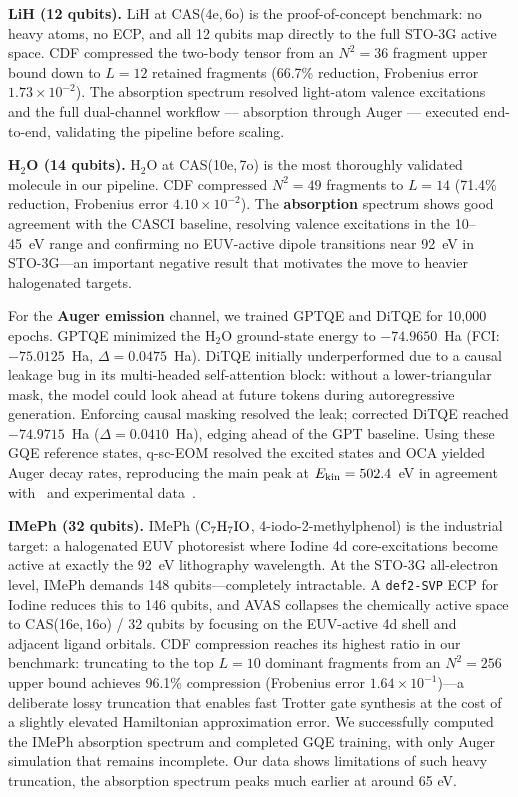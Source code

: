 \documentclass[11pt]{article}
\begin{document}
\textbf{LiH (12 qubits).}
LiH at CAS(4e,\,6o) is the proof-of-concept benchmark: no heavy atoms, no ECP, and all 12 qubits map directly to the full STO-3G active space. CDF compressed the two-body tensor from an $N^2 = 36$ fragment upper bound down to $L = 12$ retained fragments (66.7\% reduction, Frobenius error $1.73 \times 10^{-2}$). The absorption spectrum resolved light-atom valence excitations and the full dual-channel workflow --- absorption through Auger --- executed end-to-end, validating the pipeline before scaling.

\textbf{H$_2$O (14 qubits).}
H$_2$O at CAS(10e,\,7o) is the most thoroughly validated molecule in our pipeline. CDF compressed $N^2 = 49$ fragments to $L = 14$ (71.4\% reduction, Frobenius error $4.10 \times 10^{-2}$). The \textbf{absorption} spectrum shows good agreement with the CASCI baseline, resolving valence excitations in the 10--45~eV range and confirming no EUV-active dipole transitions near 92~eV in STO-3G---an important negative result that motivates the move to heavier halogenated targets.

For the \textbf{Auger emission} channel, we trained GPTQE and DiTQE for 10{,}000 epochs. GPTQE minimized the H$_2$O ground-state energy to $-74.9650$~Ha (FCI: $-75.0125$~Ha, $\Delta = 0.0475$~Ha). DiTQE initially underperformed due to a causal leakage bug in its multi-headed self-attention block: without a lower-triangular mask, the model could look ahead at future tokens during autoregressive generation. Enforcing causal masking resolved the leak; corrected DiTQE reached $-74.9715$~Ha ($\Delta = 0.0410$~Ha), edging ahead of the GPT baseline. Using these GQE reference states, q-sc-EOM resolved the excited states and OCA yielded Auger decay rates, reproducing the main peak at $E_{\rm kin} = 502.4$~eV in agreement with~\cite{keithley2026} and experimental data~\cite{moddeman1973}.

\textbf{IMePh (32 qubits).}
IMePh ($\rm C_7H_7IO$, 4-iodo-2-methylphenol) is the industrial target: a halogenated EUV photoresist where Iodine 4d core-excitations become active at exactly the 92~eV lithography wavelength. At the STO-3G all-electron level, IMePh demands 148 qubits---completely intractable. A \texttt{def2-SVP} ECP for Iodine reduces this to 146 qubits, and AVAS collapses the chemically active space to CAS(16e,\,16o) / 32 qubits by focusing on the EUV-active 4d shell and adjacent ligand orbitals. CDF compression reaches its highest ratio in our benchmark: truncating to the top $L = 10$ dominant fragments from an $N^2 = 256$ upper bound achieves 96.1\% compression (Frobenius error $1.64 \times 10^{-1}$)---a deliberate lossy truncation that enables fast Trotter gate synthesis at the cost of a slightly elevated Hamiltonian approximation error. We successfully computed the IMePh absorption spectrum and completed GQE training, with only Auger simulation that remains incomplete. Our data shows limitations of such heavy truncation, the absorption spectrum peaks much earlier at around 65 eV.
\end{document}
